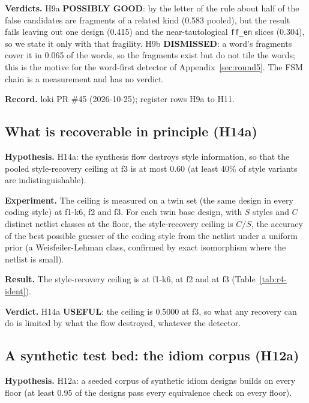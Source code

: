 \documentclass[conference]{IEEEtran}
\newcommand{\verdict}[1]{\textbf{\textsc{#1}}}
\newcommand{\hev}[1]{\par\smallskip\noindent\textbf{#1}}
\newcommand{\code}[1]{\texttt{#1}}
\begin{document}
\hev{Verdicts.} H9a \verdict{POSSIBLY GOOD}: by the letter of the rule about half of the false candidates are
fragments of a related kind (0.583 pooled), but the result fails leaving out one design (0.415) and the
near-tautological \code{ff\_en} slices (0.304), so we state it only with that fragility. H9b \verdict{DISMISSED}:
a word's fragments cover it in 0.065 of the words, so the fragments exist but do not tile the words; this is
the motive for the word-first detector of Appendix~\ref{sec:round5}. The FSM chain is a measurement and has no verdict.


\hev{Record.} loki PR \#45 (2026-10-25); register rows H9a to H11.

\subsection{What is recoverable in principle (H14a)}
\label{sec:round4}

\hev{Hypothesis.} H14a: the synthesis flow destroys style information, so that the pooled style-recovery ceiling at f3 is
at most 0.60 (at least 40\% of style variants are indistinguishable).

\hev{Experiment.} The ceiling is measured on a twin set (the same design in every coding style) at f1-k6, f2 and f3. For each
twin base design, with $S$ styles and $C$ distinct netlist classes at the floor, the style-recovery ceiling is $C/S$, the accuracy
of the best possible guesser of the coding style from the netlist under a uniform prior (a Weisfeiler-Lehman class, confirmed by
exact isomorphism where the netlist is small). %

\hev{Result.} The style-recovery ceiling is \rfsCeilOne{} at f1-k6, \rfsCeilTwo{} at f2 and \rfsCeilThree{} at f3
(Table~\ref{tab:r4-ident}).



\hev{Verdict.} H14a \verdict{USEFUL}: the ceiling is 0.5000 at f3, so what any recovery can do is limited by what the
flow destroyed, whatever the detector.

\subsection{A synthetic test bed: the idiom corpus (H12a)}
\label{sec:corpus}

\hev{Hypothesis.} H12a: a seeded corpus of synthetic idiom designs builds on every floor (at least 0.95 of the
designs pass every equivalence check on every floor).
\end{document}
